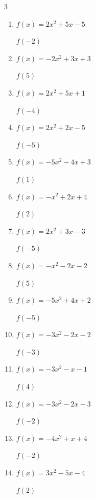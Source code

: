 \begin{multicols}{3}
\begin{enumerate}
  \item $f(x)=2x^{2}+5x-5$

$f(-2)$
        \phantom{$= -7$}

  \item $f(x)=-2x^{2}+3x+3$

$f(5)$
        \phantom{$= -32$}

  \item $f(x)=2x^{2}+5x+1$

$f(-4)$
        \phantom{$= 13$}

  \item $f(x)=2x^{2}+2x-5$

$f(-5)$
        \phantom{$= 35$}

\columnbreak %

  \item $f(x)=-5x^{2}-4x+3$

$f(1)$
        \phantom{$= -6$}

  \item $f(x)=-x^{2}+2x+4$

$f(2)$
        \phantom{$= 4$}

  \item $f(x)=2x^{2}+3x-3$

$f(-5)$
        \phantom{$= 32$}

  \item $f(x)=-x^{2}-2x-2$

$f(5)$
        \phantom{$= -37$}

  \item $f(x)=-5x^{2}+4x+2$

$f(-5)$
        \phantom{$= -143$}

  \item $f(x)=-3x^{2}-2x-2$

$f(-3)$
        \phantom{$= -23$}

  \item $f(x)=-3x^{2}-x-1$

$f(4)$
        \phantom{$= -53$}

  \item $f(x)=-3x^{2}-2x-3$

$f(-2)$
        \phantom{$= -11$}

  \item $f(x)=-4x^{2}+x+4$

$f(-2)$
        \phantom{$= -14$}

  \item $f(x)=3x^{2}-5x-4$

$f(2)$
        \phantom{$= -2$}


\end{enumerate}
\end{multicols}
